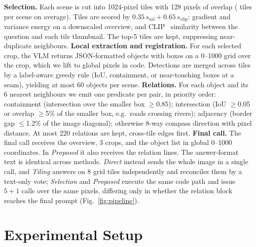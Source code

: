 \documentclass[runningheads]{llncs}
\newcommand{\Bone}{\textit{Direct}}
\newcommand{\Btwo}{\textit{Tiling}}
\newcommand{\Bthree}{\textit{Selection}}
\newcommand{\Prop}{\textit{Proposed}}
\begin{document}
\textbf{Selection.} Each scene is cut into 1024-pixel tiles with 128 pixels of overlap (\tilesTot{} tiles per scene on average). Tiles are scored by $0.35\,s_\mathrm{sal}+0.65\,s_\mathrm{clip}$: gradient and variance energy on a downscaled overview, and CLIP~\cite{radford2021clip} similarity between the question and each tile thumbnail. The top-5 tiles are kept, suppressing near-duplicate neighbours.
\textbf{Local extraction and registration.} For each selected crop, the VLM returns JSON-formatted objects with boxes on a 0--1000 grid over the crop, which we lift to global pixels in code. Detections are merged across tiles by a label-aware greedy rule (IoU, containment, or near-touching boxes at a seam), yielding at most 60 objects per scene.
\textbf{Relations.} For each object and its 6 nearest neighbours we emit one predicate per pair, in priority order: containment (intersection over the smaller box $\geq$0.85); intersection (IoU $\geq$0.05 or overlap $\geq$5\% of the smaller box, e.g.\ roads crossing rivers); adjacency (border gap $\leq$1.2\% of the image diagonal); otherwise 8-way compass direction with pixel distance. At most 220 relations are kept, cross-tile edges first.
\textbf{Final call.} The final call receives the overview, 3 crops, and the object list in global 0--1000 coordinates. In \Prop{} it also receives the relation lines. The answer-format text is identical across methods. \Bone{} instead sends the whole image in a single call, and \Btwo{} answers on 8 grid tiles independently and reconciles them by a text-only vote; \Bthree{} and \Prop{} execute the same code path and issue $5{+}1$ calls over the same pixels, differing only in whether the relation block reaches the final prompt (Fig.~\ref{fig:pipeline}).

\section{Experimental Setup}
\end{document}
